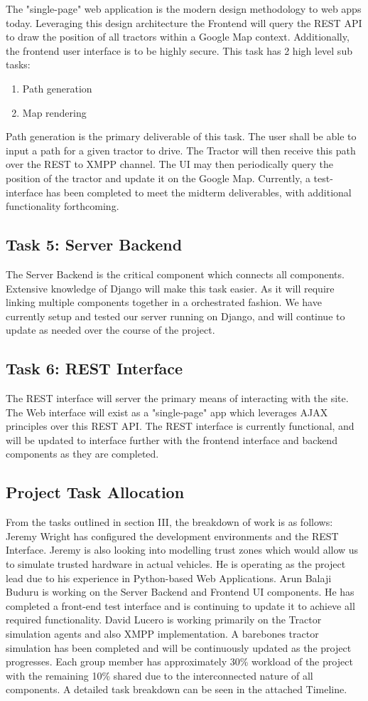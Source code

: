 \documentclass[conference,12pt]{IEEEtran}
\begin{document}
The "single-page" web application is the modern design methodology to web apps
today. Leveraging this design architecture the Frontend will query the REST API
to draw the position of all tractors within a Google Map context. Additionally, 
the frontend user interface is to be highly secure. This task has
2 high level sub tasks:
\begin{enumerate}
\item Path generation
\item Map rendering
\end{enumerate}
Path generation is the primary deliverable of this task. The user shall be
able to input a path for a given tractor to drive. The Tractor will then receive
this path over the REST to XMPP channel.  The UI may then periodically query the
position of the tractor and update it on the Google Map. Currently, a test-interface has been completed to meet the midterm deliverables, with additional functionality forthcoming.
\subsection{Task 5: Server Backend}
The Server Backend is the critical component which connects all components.
Extensive knowledge of Django will make this task easier. As it will
require linking multiple components together in a orchestrated fashion. We have currently setup and tested our server running on Django, and will continue to update as needed over the course of the project.
\subsection{Task 6: REST Interface}
The REST interface will server the primary means of interacting with the site.
The Web interface will exist as a "single-page" app which leverages AJAX
principles over this REST API. The REST interface is currently functional, and will be updated to interface further with the frontend interface and backend components as they are completed.
\subsection{Project Task Allocation}

From the tasks outlined in section III, the breakdown of work is as follows:
Jeremy Wright has configured the development environments and the REST Interface. Jeremy is also looking into modelling trust zones which would allow us to simulate trusted hardware in actual vehicles.
He is operating as the project lead due to his experience in Python-based Web Applications.
Arun Balaji Buduru is working on the Server Backend and Frontend UI components. He has completed a front-end test interface and is continuing to update it to achieve all required functionality.
David Lucero is working primarily on the Tractor simulation agents and also XMPP implementation. A barebones tractor simulation has been completed and will be continuously updated as the project progresses.
Each group member has approximately 30\% workload of the project with the remaining
10\% shared due to the interconnected nature of all components. A detailed task breakdown
can be seen in the attached Timeline.
\end{document}

